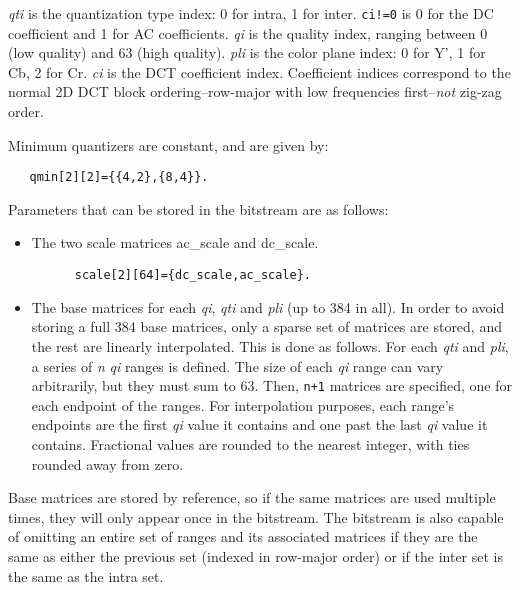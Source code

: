 {\em qti\/} is the quantization type index: 0 for intra, 1 for inter. {\tt ci!=0} is 0 for the DC coefficient and 1 for AC coefficients. {\em qi\/} is the quality index, ranging between 0 (low quality) and 63 (high quality). {\em pli\/} is the color plane index: 0 for Y', 1 for Cb, 2 for Cr. {\em ci\/} is the DCT coefficient index. Coefficient indices correspond to the normal 2D DCT block ordering--row-major with low frequencies first--{\em not\/} zig-zag order.

Minimum quantizers are constant, and are given by: 

\begin{Code}\begin{verbatim}   qmin[2][2]={{4,2},{8,4}}.
\end{verbatim}\end{Code}



Parameters that can be stored in the bitstream are as follows:\begin{itemize}
\item The two scale matrices ac\_\-scale and dc\_\-scale. 

\begin{Code}\begin{verbatim}      scale[2][64]={dc_scale,ac_scale}.
\end{verbatim}\end{Code}

\item The base matrices for each {\em qi\/}, {\em qti\/} and {\em pli\/} (up to 384 in all). In order to avoid storing a full 384 base matrices, only a sparse set of matrices are stored, and the rest are linearly interpolated. This is done as follows. For each {\em qti\/} and {\em pli\/}, a series of {\em n\/} {\em qi\/} ranges is defined. The size of each {\em qi\/} range can vary arbitrarily, but they must sum to 63. Then, {\tt n+1} matrices are specified, one for each endpoint of the ranges. For interpolation purposes, each range's endpoints are the first {\em qi\/} value it contains and one past the last {\em qi\/} value it contains. Fractional values are rounded to the nearest integer, with ties rounded away from zero.\end{itemize}


Base matrices are stored by reference, so if the same matrices are used multiple times, they will only appear once in the bitstream. The bitstream is also capable of omitting an entire set of ranges and its associated matrices if they are the same as either the previous set (indexed in row-major order) or if the inter set is the same as the intra set.

